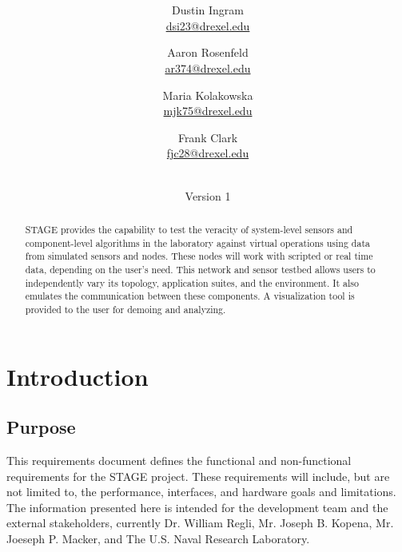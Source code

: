 \documentclass[titlepage]{article}
\title{\textbf{\mytitle}}
\author{
    Dustin Ingram \\\url{dsi23@drexel.edu}
    \and Aaron Rosenfeld \\\url{ar374@drexel.edu}
    \and Maria Kolakowska \\\url{mjk75@drexel.edu}
    \and Frank Clark \\\url{fjc28@drexel.edu}
}
\date{\mydate\\Version 1}
\begin{document}

%

\maketitle

\begin{abstract}
STAGE provides the capability to test the veracity of system-level sensors and component-level algorithms in the laboratory against virtual operations using data from simulated sensors and nodes. These nodes will work with scripted or real time data, depending on the user's need. This network and sensor testbed allows users to independently vary its topology, application suites, and the environment. It also emulates the communication between these components. A visualization tool is provided to the user for demoing and analyzing.
\end{abstract}

\setcounter{tocdepth}{4}
\tableofcontents
\pagebreak
{}



\section{Introduction%
  \label{introduction}%
}


\subsection{Purpose%
  \label{purpose}%
}

This requirements document defines the functional and non-functional requirements for the STAGE project.  These requirements will include, but are not limited to, the performance, interfaces, and hardware goals and limitations.  The information presented here is intended for the development team and the external stakeholders, currently Dr. William Regli, Mr. Joseph B. Kopena, Mr. Joeseph P. Macker, and The U.S. Naval Research Laboratory.
\end{document}
